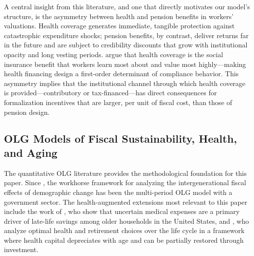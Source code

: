 \documentclass[12pt,a4paper]{article}
\begin{document}
A central insight from this literature, and one that directly motivates our model's structure, is the asymmetry between health and pension benefits in workers' valuations. Health coverage generates immediate, tangible protection against catastrophic expenditure shocks; pension benefits, by contrast, deliver returns far in the future and are subject to credibility discounts that grow with institutional opacity and long vesting periods. \citet{BaezaPackard2006} argue that health coverage is the social insurance benefit that workers learn most about and value most highly---making health financing design a first-order determinant of compliance behavior. This asymmetry implies that the institutional channel through which health coverage is provided---contributory or tax-financed---has direct consequences for formalization incentives that are larger, per unit of fiscal cost, than those of pension design.

\subsection{OLG Models of Fiscal Sustainability, Health, and Aging}
\label{subsec:lit_olg}

The quantitative OLG literature provides the methodological foundation for this paper. Since \citet{AuerbachKotlikoff1987}, the workhorse framework for analyzing the intergenerational fiscal effects of demographic change has been the multi-period OLG model with a government sector. The health-augmented extensions most relevant to this paper include the work of \citet{DeNardi2010}, who show that uncertain medical expenses are a primary driver of late-life savings among older households in the United States, and \citet{KuhnFeichtinger2015}, who analyze optimal health and retirement choices over the life cycle in a framework where health capital depreciates with age and can be partially restored through investment.
\end{document}
